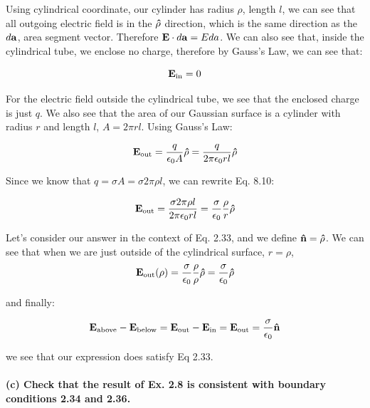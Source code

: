 \documentclass{article}
\numberwithin{equation}{section}
\numberwithin{figure}{section}
\newcommand{\vbh}[1]{\vb{\hat{#1}}}
\begin{document}
Using cylindrical coordinate, our cylinder has radius $\rho$, length $l$, we can see that all outgoing electric field is in the $\vbh \rho$ direction, which is the same direction as the $d \vb a$, area segment vector. Therefore $ \vb E \cdot d \vb a = E da$. We can also see that, inside the cylindrical tube, we enclose no charge, therefore by Gauss's Law, we can see that:

\begin{equation}
    \vb E_{\text{in}} = 0
\end{equation}

For the electric field outside the cylindrical tube, we see that the enclosed charge is just $q$. We also see that the area of our Gaussian surface is a cylinder with radius $r$ and length $l$, $A = 2 \pi r l$. Using Gauss's Law:

\begin{equation}
    \vb E_\text{out} = \frac{q}{\epsilon_0 A} \vbh \rho = \frac{q}{2 \pi \epsilon_0 r l} \vbh \rho
\end{equation}

Since we know that $q = \sigma A = \sigma 2 \pi \rho l$, we can rewrite Eq. 8.10:

\begin{equation}
    \vb E_\text{out}  = \frac{\sigma 2 \pi \rho l}{2 \pi \epsilon_0 r l} = \frac{\sigma}{\epsilon_0} \frac{\rho}{r} \vbh \rho
\end{equation}

Let's consider our answer in the context of Eq. 2.33, and we define $\vbh n = \vbh \rho$. We can see that when we are just outside of the cylindrical surface, $r = \rho$, \begin{equation}
    \vb E_\text{out} (\rho) = \frac{\sigma}{\epsilon_0} \frac{\rho}{\rho} \vbh \rho = \frac{\sigma}{\epsilon_0} \vbh \rho
\end{equation}

and finally:

\begin{equation}
     \vb E_{\text{above}} - \vb E_{\text{below}} = \vb E_{\text{out}} - \vb E_{\text{in}} = \vb E_{\text{out}} =  \frac{\sigma}{\epsilon_0} \vbh n
\end{equation}

we see that our expression does satisfy Eq 2.33.

\paragraph{(c) Check that the result of Ex. 2.8 is consistent with boundary conditions 2.34 and 2.36.\\}
\end{document}
